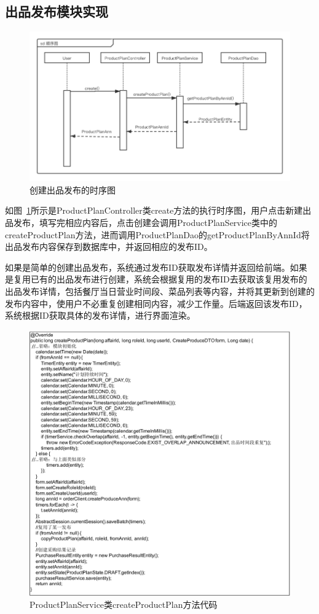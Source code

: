 \subsection{出品发布模块实现}

\begin{figure}[htbp!]
    \centering
    \includegraphics[width=4.5in]{FIGs/chapter4/dish_time.pdf}
    \caption{创建出品发布的时序图}\label{fig_dish_time}
\end{figure}

如图~\ref{fig_dish_time}所示是ProductPlanController类create方法的执行时序图，用户点击新建出品发布，填写完相应内容后，点击创建会调用ProductPlanService类中的createProductPlan方法，进而调用ProductPlanDao的getProductPlanByAnnId将出品发布内容保存到数据库中，并返回相应的发布ID。

如果是简单的创建出品发布，系统通过发布ID获取发布详情并返回给前端。如果是复用已有的出品发布进行创建，系统会根据复用的发布ID去获取该复用发布的出品发布详情，包括餐厅当日营业时间段、菜品列表等内容，并将其更新到创建的发布内容中，使用户不必重复创建相同内容，减少工作量。后端返回该发布ID，系统根据ID获取具体的发布详情，进行界面渲染。

\begin{figure}[htbp!]
    \centering
    \includegraphics[width=5in]{FIGs/chapter4/14.pdf}
    \caption{ProductPlanService类createProductPlan方法代码}\label{fig_dish_14}
\end{figure}


